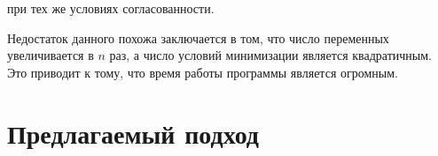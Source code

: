 \documentclass[a4paper, 12pt, titlepage]{article}
\theoremstyle{definition}
\theoremstyle{plain}
\theoremstyle{plain}
\begin{document}
при тех же условиях согласованности.

Недостаток данного похожа заключается в том, что число переменных
увеличивается в $n$ раз, а число условий минимизации является квадратичным. Это
приводит к тому, что время работы программы является огромным.





\newpage
\section{Предлагаемый подход}

\newpage


\end{document}
